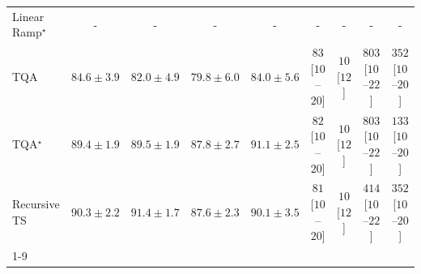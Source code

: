 \begin{tabular}{l|cccc|cccc|}
Linear Ramp$^\star$ & {\cellcolor[HTML]{000000}} \color[HTML]{F1F1F1} {\cellcolor{white}} \color{black} - & {\cellcolor[HTML]{000000}} \color[HTML]{F1F1F1} {\cellcolor{white}} \color{black} - & {\cellcolor[HTML]{000000}} \color[HTML]{F1F1F1} {\cellcolor{white}} \color{black} - & {\cellcolor[HTML]{000000}} \color[HTML]{F1F1F1} {\cellcolor{white}} \color{black} - & {\cellcolor[HTML]{000000}} \color[HTML]{F1F1F1} {\cellcolor{white}} \color{black} - & {\cellcolor[HTML]{000000}} \color[HTML]{F1F1F1} {\cellcolor{white}} \color{black} - & {\cellcolor[HTML]{000000}} \color[HTML]{F1F1F1} {\cellcolor{white}} \color{black} - & {\cellcolor[HTML]{000000}} \color[HTML]{F1F1F1} {\cellcolor{white}} \color{black} - \\
TQA & {\cellcolor[HTML]{2F8BBE}} \color[HTML]{F1F1F1} $84.6\pm 3.9$ & {\cellcolor[HTML]{63A2CB}} \color[HTML]{F1F1F1} $82.0\pm 4.9$ & {\cellcolor[HTML]{8BB2D4}} \color[HTML]{000000} $79.8\pm 6.0$ & {\cellcolor[HTML]{3B92C1}} \color[HTML]{F1F1F1} $84.0\pm 5.6$ & {\cellcolor[HTML]{FEE6E3}} \color[HTML]{000000} $83$ [$10$--$20$] & {\cellcolor[HTML]{FFF7F3}} \color[HTML]{000000} $10$ [$12$] & {\cellcolor[HTML]{49006A}} \color[HTML]{F1F1F1} $803$ [$10$--$22$] & {\cellcolor[HTML]{F986AC}} \color[HTML]{F1F1F1} $352$ [$10$--$20$] \\
TQA$^\star$ & {\cellcolor[HTML]{046097}} \color[HTML]{F1F1F1} $89.4\pm 1.9$ & {\cellcolor[HTML]{046096}} \color[HTML]{F1F1F1} $89.5\pm 1.9$ & {\cellcolor[HTML]{056CAA}} \color[HTML]{F1F1F1} $87.8\pm 2.7$ & {\cellcolor[HTML]{045280}} \color[HTML]{F1F1F1} $91.1\pm 2.5$ & {\cellcolor[HTML]{FEE6E3}} \color[HTML]{000000} $82$ [$10$--$20$] & {\cellcolor[HTML]{FFF7F3}} \color[HTML]{000000} $10$ [$12$] & {\cellcolor[HTML]{49006A}} \color[HTML]{F1F1F1} $803$ [$10$--$22$] & {\cellcolor[HTML]{FDDAD7}} \color[HTML]{000000} $133$ [$10$--$20$] \\
Recursive TS & {\cellcolor[HTML]{045A8D}} \color[HTML]{F1F1F1} $90.3\pm 2.2$ & {\cellcolor[HTML]{034D79}} \color[HTML]{F1F1F1} $91.4\pm 1.7$ & {\cellcolor[HTML]{056DAC}} \color[HTML]{F1F1F1} $87.6\pm 2.3$ & {\cellcolor[HTML]{045B8F}} \color[HTML]{F1F1F1} $90.1\pm 3.5$ & {\cellcolor[HTML]{FEE7E4}} \color[HTML]{000000} $81$ [$10$--$20$] & {\cellcolor[HTML]{FFF7F3}} \color[HTML]{000000} $10$ [$12$] & {\cellcolor[HTML]{F564A0}} \color[HTML]{F1F1F1} $414$ [$10$--$22$] & {\cellcolor[HTML]{F986AC}} \color[HTML]{F1F1F1} $352$ [$10$--$20$] \\
\cline{1-9}
\bottomrule
\end{tabular}
